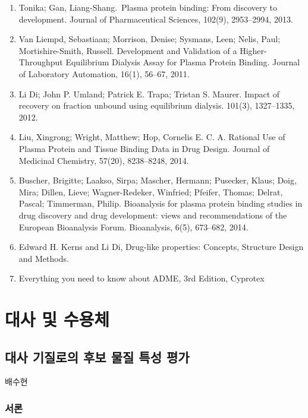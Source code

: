 \documentclass[
  11pt,
  krantz2, a4paper, twoside]{krantz}
\providecommand{\tightlist}{%
  \setlength{\itemsep}{0pt}\setlength{\parskip}{0pt}}
\begin{document}
\begin{enumerate}
\def\labelenumi{\arabic{enumi}.}
\tightlist
\item
  Tonika; Gan, Liang-Shang.~Plasma protein binding: From discovery to development. Journal of Pharmaceutical Sciences, 102(9), 2953--2994, 2013.
\item
  Van Liempd, Sebastiaan; Morrison, Denise; Sysmans, Leen; Nelis, Paul; Mortishire-Smith, Russell. Development and Validation of a Higher-Throughput Equilibrium Dialysis Assay for Plasma Protein Binding. Journal of Laboratory Automation, 16(1), 56--67, 2011.
\item
  Li Di; John P. Umland; Patrick E. Trapa; Tristan S. Maurer. Impact of recovery on fraction unbound using equilibrium dialysis. 101(3), 1327--1335, 2012.
\item
  Liu, Xingrong; Wright, Matthew; Hop, Cornelis E. C. A. Rational Use of Plasma Protein and Tissue Binding Data in Drug Design. Journal of Medicinal Chemistry, 57(20), 8238--8248, 2014.
\item
  Buscher, Brigitte; Laakso, Sirpa; Mascher, Hermann; Pusecker, Klaus; Doig, Mira; Dillen, Lieve; Wagner-Redeker, Winfried; Pfeifer, Thomas; Delrat, Pascal; Timmerman, Philip. Bioanalysis for plasma protein binding studies in drug discovery and drug development: views and recommendations of the European Bioanalysis Forum. Bioanalysis, 6(5), 673--682, 2014.
\item
  Edward H. Kerns and Li Di, Drug-like properties: Concepts, Structure Design and Methods.
\item
  Everything you need to know about ADME, 3rd Edition, Cyprotex
\end{enumerate}

\part{대사 및 수용체}\label{part-uxb300uxc0ac-uxbc0f-uxc218uxc6a9uxccb4}

\chapter{대사 기질로의 후보 물질 특성 평가}\label{uxb300uxc0ac-uxae30uxc9c8uxb85cuxc758-uxd6c4uxbcf4-uxbb3cuxc9c8-uxd2b9uxc131-uxd3c9uxac00}

\Large\hfill

배수현
\normalsize

\section{서론}\label{uxc11cuxb860-3}
\end{document}
